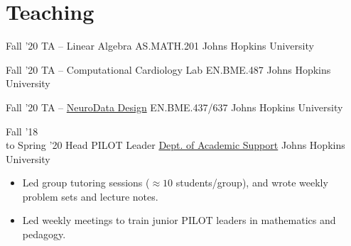 \section{Teaching}

\cventry
{Fall '20}
{TA -- Linear Algebra}
{AS.MATH.201}
{Johns Hopkins University}
{}
{}

\cventry
{Fall '20}
{TA -- Computational Cardiology Lab}
{EN.BME.487}
{Johns Hopkins University}
{}
{}

\cventry
{Fall '20}
{TA -- \href{http://neurodatadesign.io}{NeuroData Design}}
{EN.BME.437/637}
{Johns Hopkins University}
{}
{}

\cventry
{Fall '18 \\to Spring '20}
{Head PILOT Leader}
{\href{https://academicsupport.jhu.edu/pilot/}{Dept. of Academic Support}}
{Johns Hopkins University}
{}
{
\begin{itemize}
    \item Led group tutoring sessions ($\approx 10$ students/group), and wrote weekly problem sets and lecture notes.
    \item Led weekly meetings to train junior PILOT leaders in mathematics and pedagogy.
\end{itemize}
}